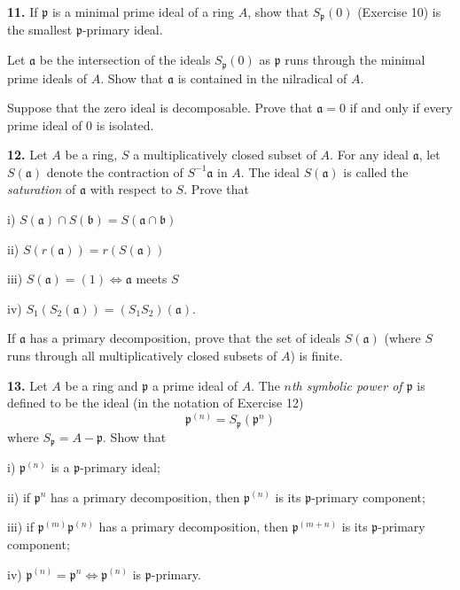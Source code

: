 
\noindent\textbf{11.} If $\mathfrak p$ is a minimal prime ideal of a ring $A$, show that $S_\mathfrak p(0)$ (Exercise 10) is the
smallest $\mathfrak p$-primary ideal.

Let $\mathfrak a$ be the intersection of the ideals $S_\mathfrak p(0)$ as $\mathfrak p$ runs through the minimal
prime ideals of $A$.  Show that $\mathfrak a$ is contained in the nilradical of $A$.

Suppose that the zero ideal is decomposable.  Prove that $\mathfrak a=0$ if and only if
every prime ideal of 0 is isolated.

\medskip
\noindent\textbf{12.} Let $A$ be a ring, $S$ a multiplicatively closed subset of $A$.  For any ideal $\mathfrak a$, let $S(\mathfrak a)$
denote the contraction of $S^{-1}\mathfrak a$ in $A$.  The ideal $S(\mathfrak a)$ is called the \emph{saturation} of $\mathfrak a$
with respect to $S$.  Prove that

i) $S(\mathfrak a)\cap S(\mathfrak b)=S(\mathfrak a\cap\mathfrak b)$

ii) $S(r(\mathfrak a))=r(S(\mathfrak a))$

iii) $S(\mathfrak a)=(1)\Longleftrightarrow\mathfrak a$ meets $S$

iv) $S_1(S_2(\mathfrak a))=(S_1S_2)(\mathfrak a)$.

If $\mathfrak a$ has a primary decomposition, prove that the set of ideals $S(\mathfrak a)$ (where $S$ runs
through all multiplicatively closed subsets of $A$) is finite.

\medskip
\noindent\textbf{13.} Let $A$ be a ring and $\mathfrak p$ a prime ideal of $A$.  The \emph{$n$th symbolic power of $\mathfrak p$} is defined
to be the ideal (in the notation of Exercise 12)
\[
\mathfrak p^{(n)}=S_\mathfrak p(\mathfrak p^n)
\]
where $S_\mathfrak p=A-\mathfrak p$.  Show that

i) $\mathfrak p^{(n)}$ is a $\mathfrak p$-primary ideal;

ii) if $\mathfrak p^n$ has a primary decomposition, then $\mathfrak p^{(n)}$ is its $\mathfrak p$-primary component;

iii) if $\mathfrak p^{(m)}\mathfrak p^{(n)}$ has a primary decomposition, then $\mathfrak p^{(m+n)}$ is its $\mathfrak p$-primary component;

iv) $\mathfrak p^{(n)}=\mathfrak p^n\Longleftrightarrow\mathfrak p^{(n)}$ is $\mathfrak p$-primary.

